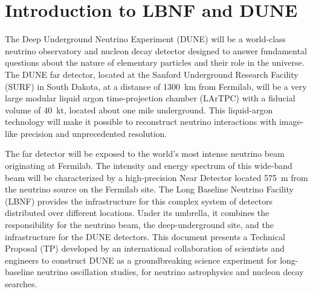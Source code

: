 \chapter{Introduction to LBNF and DUNE}
\label{ch:project-overview}

The Deep Underground Neutrino Experiment (DUNE) will be a world-class neutrino observatory and nucleon decay detector designed
to answer fundamental questions about the nature of elementary particles and their role in the universe. 
The DUNE far detector, located at the Sanford Underground Research 
Facility (SURF) in South Dakota, at a distance of \SI{1300}{\km} from Fermilab, 
will be a very large modular liquid argon time-projection chamber (LArTPC) with a fiducial volume of 40~kt, located about one mile underground. 
This liquid-argon technology will make it possible to reconstruct neutrino interactions with image-like precision and unprecedented resolution.

The far detector will be exposed to
the world's most intense neutrino beam originating at Fermilab. 
The intensity and energy spectrum of this wide-band beam will be characterized by a high-precision Near Detector
located 575~m from the neutrino source on the Fermilab site.
The Long Baseline Neutrino Facility (LBNF) provides the infrastructure for this complex system of detectors distributed over different locations.
Under its umbrella, it combines the responsibility for the neutrino beam, 
the deep-underground site, and the infrastructure for the DUNE detectors.
This document presents 
a Technical Proposal (TP) developed by an international collaboration of scientists and engineers to construct DUNE
as a groundbreaking science experiment for long-baseline neutrino oscillation studies, for neutrino astrophysics and nucleon decay searches.


